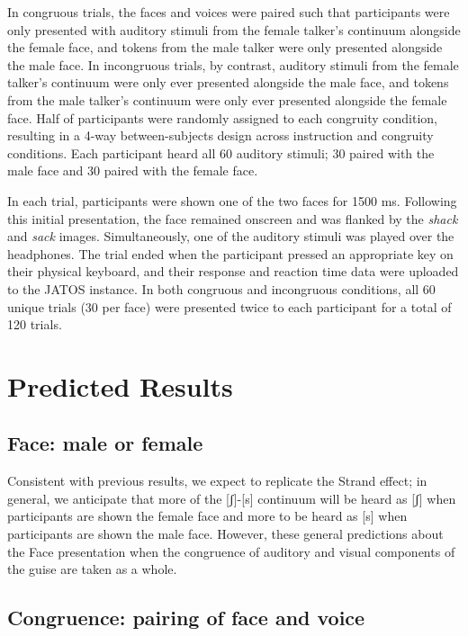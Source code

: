\documentclass[
  letterpaper,
  DIV=11,
  numbers=noendperiod]{scrartcl}
\begin{document}
In congruous trials, the faces and voices were paired such that
participants were only presented with auditory stimuli from the female
talker's continuum alongside the female face, and tokens from the male
talker were only presented alongside the male face. In incongruous
trials, by contrast, auditory stimuli from the female talker's continuum
were only ever presented alongside the male face, and tokens from the
male talker's continuum were only ever presented alongside the female
face. Half of participants were randomly assigned to each congruity
condition, resulting in a 4-way between-subjects design across
instruction and congruity conditions. Each participant heard all 60
auditory stimuli; 30 paired with the male face and 30 paired with the
female face.

In each trial, participants were shown one of the two faces for 1500 ms.
Following this initial presentation, the face remained onscreen and was
flanked by the \emph{shack} and \emph{sack} images. Simultaneously, one
of the auditory stimuli was played over the headphones. The trial ended
when the participant pressed an appropriate key on their physical
keyboard, and their response and reaction time data were uploaded to the
JATOS instance. In both congruous and incongruous conditions, all 60
unique trials (30 per face) were presented twice to each participant for
a total of 120 trials.

\section{Predicted Results}\label{sec-predictions}

\subsection{Face: male or female}\label{sec-pred-face}

Consistent with previous results, we expect to replicate the Strand
effect; in general, we anticipate that more of the {[}ʃ{]}-{[}s{]}
continuum will be heard as {[}ʃ{]} when participants are shown the
female face and more to be heard as {[}s{]} when participants are shown
the male face. However, these general predictions about the Face
presentation when the congruence of auditory and visual components of
the guise are taken as a whole.

\subsection{Congruence: pairing of face and
voice}\label{sec-pred-congruence}
\end{document}
